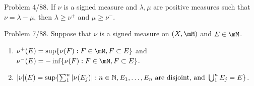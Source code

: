 \documentclass{article}
\begin{document}
 Problem 4/88. If $\nu$ is a signed measure and $\lambda, \mu$ are positive measures such that $\nu = \lambda - \mu$, then $\lambda \ge \nu^+$ and $\mu \ge \nu^-$.

 Problem 7/88. Suppose that $\nu$ is a signed measure on $(X, \mM)$ and $E \in \mM$.
\begin{enumerate}[\bfseries a.]

\item $\nu^+(E) = \sup\{\nu(F) : F \in \mM, F \subset E\}$ and $\nu^-(E) = - \inf\{\nu(F) : F \in \mM, F \subset E\}$.

\item $|\nu|(E) = \sup\{\sum_1^n |\nu(E_j)| : n \in \mathbb{N}, E_1, \ldots, E_n \text{ are disjoint, and } \bigcup_1^n E_j = E\}$.
\end{enumerate}
\end{document}

